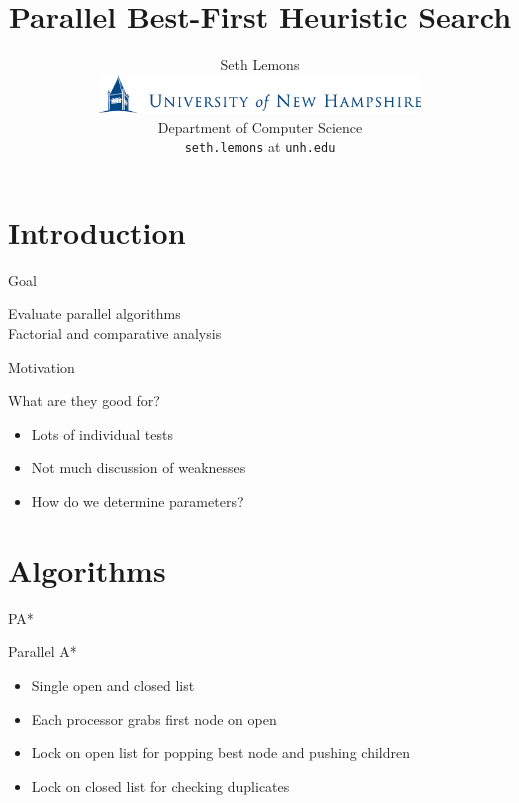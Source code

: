 \documentclass[style=unh]{powerdot}
\title{Parallel Best-First Heuristic Search}
\author{Seth Lemons \vspace{0.2in} \\
  \includegraphics[height=0.4in]{figures/unh-logo-words.eps} \\
  Department of Computer Science \\
  {\tt seth.lemons} at {\tt unh.edu}}
\date{\mbox{}}
\begin{document}
\maketitle


\section[slide=false]{Introduction}


\begin{slide}{Goal}
  \vspace{1in}
  \begin{center}
    Evaluate parallel algorithms \\
    {\tiny Factorial and comparative analysis}
  \end{center}

\end{slide}


\begin{slide}{Motivation}
    \begin{center}
      What are they good for?
    \end{center}

    \begin{itemize}
    \item Lots of individual tests
    \item Not much discussion of weaknesses
    \item How do we determine parameters?
    \end{itemize}
\end{slide}


\section{Algorithms}


\begin{slide}{PA*}
  \vspace{.2in}
  \begin{center}
    Parallel A*
  \end{center}

  \vspace{.1in}

  \begin{itemize}[type=1]
  \item Single open and closed list
  \item Each processor grabs first node on open
  \item Lock on open list for popping best node and pushing children
  \item Lock on closed list for checking duplicates
  \end{itemize}
\end{slide}
\end{document}
